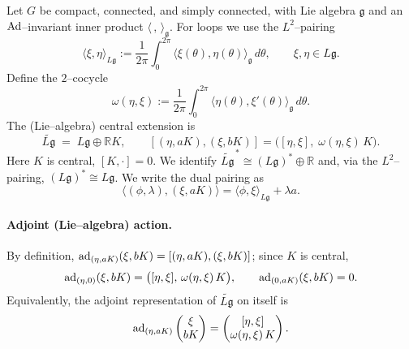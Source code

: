 \documentclass[12pt]{article}
\begin{document}
\begin{remark}
    Let $G$ be compact, connected, and simply connected, with Lie algebra $\mathfrak g$
    and an $\operatorname{Ad}$–invariant inner product $\langle\,,\,\rangle_{\mathfrak g}$.
    For loops we use the $L^2$–pairing
    \[
        \langle \xi,\eta\rangle_{L\mathfrak g}
        := \frac{1}{2\pi}\int_0^{2\pi}\langle \xi(\theta),\eta(\theta)\rangle_{\mathfrak g}\,d\theta,
        \qquad \xi,\eta\in L\mathfrak g .
    \]
    Define the $2$–cocycle
    \[
        \omega(\eta,\xi)
        := \frac{1}{2\pi}\int_0^{2\pi}\!\!\langle \eta(\theta),\xi'(\theta)\rangle_{\mathfrak g}\,d\theta.
    \]
    The (Lie–algebra) central extension is
    \[
        \widetilde{L\mathfrak g} \;=\; L\mathfrak g \oplus \mathbb R K,
        \qquad
        [(\eta,aK),(\xi,bK)]
        = \big([\eta,\xi],\;\omega(\eta,\xi)\,K\big).
    \]
    Here $K$ is central, $[K,\cdot]=0$.
    We identify $\widetilde{L\mathfrak g}^{\,*}\cong (L\mathfrak g)^*\oplus\mathbb R$ and,
    via the $L^2$–pairing, $(L\mathfrak g)^*\cong L\mathfrak g$.
    We write the dual pairing as
    \[
        \big\langle (\phi,\lambda),(\xi,aK)\big\rangle
        = \langle \phi,\xi\rangle_{L\mathfrak g} + \lambda a .
    \]

    \paragraph{Adjoint (Lie–algebra) action.}
    By definition, $\operatorname{ad}_{(\eta,aK)}(\xi,bK)=[(\eta,aK),(\xi,bK)]$; since $K$ is central,
    \[
        \operatorname{ad}_{(\eta,0)}(\xi,bK) = \big([\eta,\xi],\,\omega(\eta,\xi)\,K\big), \qquad
        \operatorname{ad}_{(0,aK)}(\xi,bK)=0 .
    \]
    Equivalently, the adjoint representation of $\widetilde{L\mathfrak g}$ on itself is
    \[
        \operatorname{ad}_{(\eta,aK)}
        \begin{pmatrix}\xi\\ bK\end{pmatrix}
        =
        \begin{pmatrix}
            [\eta,\xi] \\ \omega(\eta,\xi)\,K
        \end{pmatrix}.
    \]


\end{remark}
\end{document}
